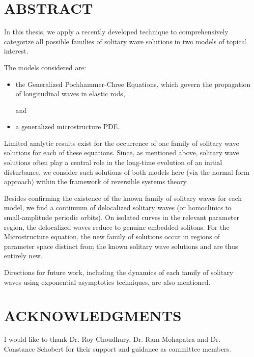 \chapter*{ABSTRACT}

\indent 

In this thesis, we apply a recently developed technique to
comprehensively categorize all possible families of solitary wave
solutions in two models of topical interest.

The models considered are:
\begin{itemize}
\item the Generalized Pochhammer-Chree Equations, which  govern the propagation of longitudinal waves in elastic rods,

and

\item a generalized microstructure PDE.
\end{itemize}

Limited analytic results exist for the occurrence of one family of  solitary
wave solutions for each of these equations. Since, as mentioned above, solitary
wave solutions often play a central role in the long-time evolution of an
initial disturbance, we consider such solutions of both models here (via the
normal form approach) within the framework of reversible systems theory.

Besides confirming the existence of the known family of solitary waves for each
model, we find a continuum of delocalized solitary waves (or homoclinics to
small-amplitude periodic orbits).  On isolated curves in the relevant parameter
region, the delocalized waves reduce to genuine embedded solitons.  For the
Microstructure equation, the new family of solutions occur in regions of
parameter space distinct from the known solitary wave solutions and are thus
entirely new.

Directions for future work, including the dynamics of each family of
solitary waves using exponential asymptotics techniques, are also mentioned.



\dedication{
Dedicated To My Family
}



\newpage
{}
\chapter*{ACKNOWLEDGMENTS}

I would like to thank Dr. Roy Choudhury, Dr. Ram Mohapatra and Dr. Constance Schobert for their support and guidance as committee members.

\newpage
